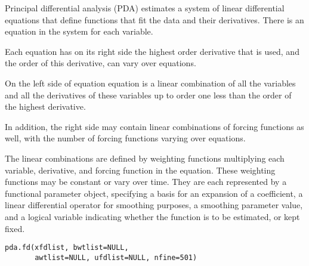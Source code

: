 \begin{Description}\relax
Principal differential analysis (PDA) estimates a
system of  linear differential equations that define functions
that fit the data and their derivatives.  There is an equation in the
system for each variable.  

Each equation has on its right side the highest order derivative that is used, 
and the order of this derivative,  can vary over equations.    

On the left side of equation equation is a linear combination of all the 
variables and all the derivatives of these variables up to order one less than 
the order  of the highest derivative.

In addition, the right side may contain linear combinations of forcing
functions as well, with the number of forcing functions varying over 
equations.

The linear combinations are defined by weighting functions multiplying each
variable, derivative, and forcing function in the equation.  These weighting
functions may be constant or vary over time.  They are each represented by a
functional parameter object, specifying a basis for an expansion of a
coefficient, a linear differential operator for smoothing purposes, a 
smoothing parameter value, and a logical variable indicating whether the
function is to be estimated, or kept fixed.
\end{Description}
\begin{Usage}
\begin{verbatim}
pda.fd(xfdlist, bwtlist=NULL,
       awtlist=NULL, ufdlist=NULL, nfine=501)
\end{verbatim}
\end{Usage}
